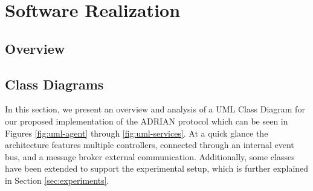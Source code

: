 \section{Software Realization}
\label{sec:software-realization}

\subsection{Overview}
\label{ssec:overview}

\subsection{Class Diagrams}
\label{ssec:class-diagrams}


In this section, we present an overview and analysis of a UML Class Diagram for our proposed implementation of the ADRIAN protocol\cite{mann2023ADRIAN} which can be seen in Figures \ref{fig:uml-agent} through \ref{fig:uml-services}. At a quick glance the architecture features multiple controllers, connected through an internal event bus, and a message broker external communication. Additionally, some classes have been extended to support the experimental setup, which is further explained in Section \ref{sec:experiments}.

